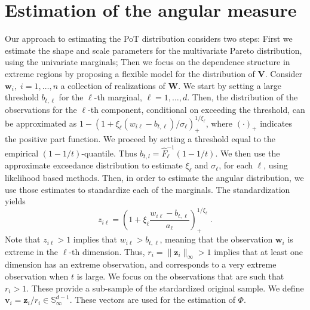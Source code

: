 \section{Estimation of the angular measure\label{sec:methodology}}

Our approach to estimating the PoT distribution considers two steps: First we 
    estimate the shape and scale parameters for the
    multivariate Pareto distribution, using the univariate marginals; Then 
    we focus on the dependence structure in extreme regions by proposing a 
    flexible model for the distribution of $\bm{V}$.  
    Consider $\bm{w}_i,\;i =1,\ldots,n$ a collection of realizations of $\bm{W}$.
    We start by setting a large threshold 
    $b_{t,\ell}$ for the  $\ell$-th marginal, $\ell = 1, \ldots,d$. Then, the 
    distribution of the observations for the $\ell$-th component, 
    conditional on exceeding the threshold, can be 
    approximated as $1 - (1 + \xi_\ell   (w_{i\ell} - b_{t,\ell})/\sigma_\ell)_+^
    {1/\xi_\ell}$, where $(\cdot)_+$ indicates the positive part function.  We 
    proceed by setting a threshold equal to the empirical $(1-1/t)$-quantile. 
    Thus $b_{t,l}  = \hat{F}^{-1}_{\ell}(1 - 1/t)$.  We then use the 
    approximate exceedance distribution to estimate $\xi_\ell$ and $\sigma_\ell$,
    for each $\ell$, using likelihood based methods. Then, in order to estimate 
    the angular distribution, we use those estimates to standardize each of 
    the marginals. The standardization yields
    \begin{equation}
            \label{eqn:standardization}
            z_{i\ell} = \left(1 + \xi_{\ell}\frac{w_{i\ell} -
                b_{t,\ell}}{a_{\ell}}\right)_{+}^{1/\xi_{\ell}}\; .
        \end{equation}
    Note that $z_{i\ell}> 1$ implies that $w_{i\ell} > b_{t,\ell}$, meaning 
    that the observation $\bm{w}_i$ is extreme in the $\ell$-th dimension. 
    Thus, $r_i = \|\bm{z}_i\|_\infty > 1$ implies that at
    least one dimension has an extreme observation, and corresponds 
    to a very extreme observation when $t$ is large. We focus on 
    the observations that are such that $r_i > 1$. These provide a
    sub-sample of the stardardized original sample. We define $\bm{v}_i = 
    \bm{z}_i /r_i \in  \mathbb{S}_{\infty}^{d-1}$. These vectors are used 
    for  the estimation of $\Phi$. 




